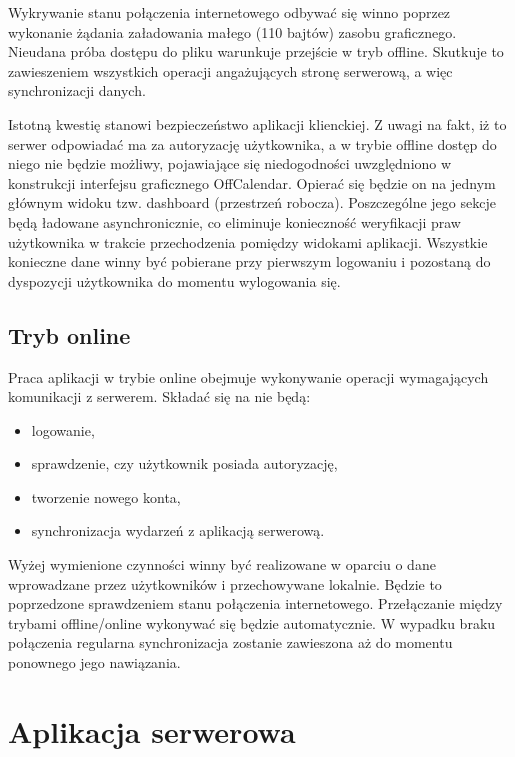 Wykrywanie stanu połączenia internetowego odbywać się winno poprzez wykonanie żądania załadowania małego (110 bajtów) zasobu graficznego. Nieudana próba dostępu do pliku warunkuje przejście w tryb offline. Skutkuje to zawieszeniem wszystkich operacji angażujących stronę serwerową, a więc synchronizacji danych.
	
Istotną kwestię stanowi bezpieczeństwo aplikacji klienckiej. Z uwagi na fakt, iż to serwer odpowiadać ma za autoryzację użytkownika, a w trybie offline dostęp do niego nie będzie możliwy, pojawiające się niedogodności uwzględniono w konstrukcji interfejsu graficznego OffCalendar. Opierać się będzie on na jednym głównym widoku tzw. dashboard (przestrzeń robocza). Poszczególne jego sekcje będą ładowane asynchronicznie, co eliminuje konieczność weryfikacji praw użytkownika w trakcie przechodzenia pomiędzy widokami aplikacji. Wszystkie konieczne dane winny być pobierane przy pierwszym logowaniu i pozostaną do dyspozycji użytkownika do momentu wylogowania się.

\subsection{Tryb online}
\label{trybOn}

Praca aplikacji w trybie online obejmuje wykonywanie operacji wymagających komunikacji z serwerem. Składać się na nie będą:

\begin{itemize}
\item logowanie,
\item sprawdzenie, czy użytkownik posiada autoryzację,
\item tworzenie nowego konta,
\item synchronizacja wydarzeń z aplikacją serwerową.
\end{itemize}

Wyżej wymienione czynności winny być realizowane w oparciu o dane wprowadzane przez użytkowników i przechowywane lokalnie. Będzie to poprzedzone sprawdzeniem stanu połączenia internetowego. Przełączanie między trybami offline/online wykonywać się będzie automatycznie. W wypadku braku połączenia regularna synchronizacja zostanie zawieszona aż do momentu ponownego jego nawiązania.

\section{Aplikacja serwerowa}
\label{sec:appSerw}

